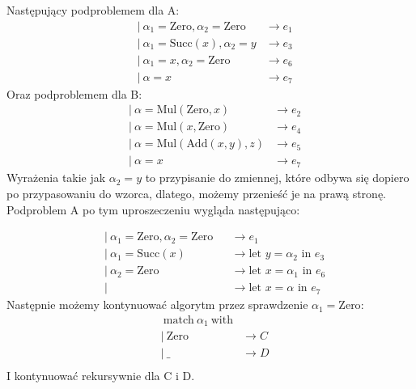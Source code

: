 \documentclass{article}
\begin{document}
Następujący podproblemem dla A:
\begin{align*}
   & |\ \alpha_1 = \text{Zero}, \alpha_2 = \text{Zero} & \rightarrow e_1 \\
   & |\ \alpha_1 = \text{Succ}(x), \alpha_2 = y        & \rightarrow e_3 \\
   & |\ \alpha_1 = x, \alpha_2 = \text{Zero}           & \rightarrow e_6 \\
   & |\ \alpha = x                                     & \rightarrow e_7
\end{align*}
Oraz podproblemem dla B:
\begin{align*}
   & |\ \alpha = \text{Mul}(\text{Zero}, x)     & \rightarrow e_2 \\
   & |\ \alpha = \text{Mul}(x, \text{Zero})     & \rightarrow e_4 \\
   & |\ \alpha = \text{Mul}(\text{Add}(x,y), z) & \rightarrow e_5 \\
   & |\ \alpha = x                              & \rightarrow e_7
\end{align*}
Wyrażenia takie jak $\alpha_2=y$ to przypisanie do zmiennej, które odbywa się dopiero po przypasowaniu do wzorca, dlatego, możemy przenieść je na prawą stronę. Podproblem A po tym uproszeczeniu wygląda następująco:

\begin{align*}
   & |\ \alpha_1 = \text{Zero}, \alpha_2 = \text{Zero} &  & \rightarrow e_1                                     \\
   & |\ \alpha_1 = \text{Succ}(x)                      &  & \rightarrow\text{let } y = \alpha_2 \text{ in }e_3  \\
   & |\ \alpha_2 = \text{Zero}                         &  & \rightarrow\text{let } x = \alpha_1 \text{ in } e_6 \\
   & |\                                                &  & \rightarrow\text{let } x = \alpha \text{ in } e_7
\end{align*}
Następnie możemy kontynuować algorytm przez sprawdzenie $\alpha_1=\text{Zero}$:
\begin{align*}
   & \ \text{match}\ \alpha_1\ \text{with}                 \\
   & |\  \text{Zero}                       & \rightarrow C \\
   & |\ \_                                 & \rightarrow D \\
\end{align*}
I kontynuować rekursywnie dla C i D.
\end{document}
